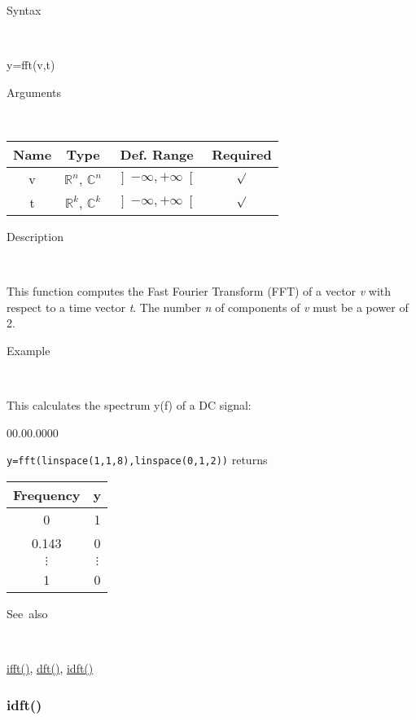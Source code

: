 \begin{description}
\item [Syntax]~
\end{description}
y=fft(v,t)

\begin{description}
\item [Arguments]~
\end{description}
\begin{tabular}{|c|c|c|c|}
\hline 
Name&
Type&
Def. Range&
Required\tabularnewline
\hline
\hline 
v&
$\mathbb{R}^{n}$, $\mathbb{C}^{n}$&
$\left]-\infty,+\infty\right[$&
$\surd$\tabularnewline
\hline 
t&
$\mathbb{R}^{k}$, $\mathbb{C}^{k}$&
$\left]-\infty,+\infty\right[$&
$\surd$\tabularnewline
\hline
\end{tabular}

\begin{description}
\item [Description]~
\end{description}
This function computes the Fast Fourier Transform (FFT) of a vector
\textit{v} with respect to a time vector \textit{t}. The number \textit{n}
of components of \textit{v} must be a power of 2.

\begin{description}
\item [Example]~
\end{description}
This calculates the spectrum y(f) of a DC signal:

\begin{lyxlist}{00.00.0000}
\item [\texttt{y=fft(linspace(1,1,8),linspace(0,1,2))}]returns \begin{tabular}{|c|c|}
\hline 
Frequency&
y\tabularnewline
\hline
\hline 
0&
1\tabularnewline
\hline 
0.143&
0\tabularnewline
\hline 
$\vdots$&
$\vdots$\tabularnewline
\hline 
1&
0\tabularnewline
\hline
\end{tabular}
\end{lyxlist}
\begin{description}
\item [See~also]~
\end{description}
\textcolor{blue}{\hyperlink{ifft}{ifft()}}\textcolor{black}{,} \textcolor{blue}{\hyperlink{dft}{dft()}}\textcolor{black}{,}
\textcolor{blue}{\hyperlink{idft}{idft()}}


\newpage
\subsubsection*{\hypertarget{idft}{}{\Large idft()}}


